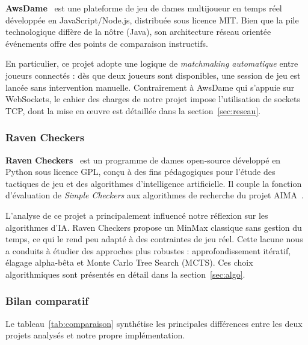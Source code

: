 \documentclass[a4paper]{article}
\begin{document}
\textbf{AwsDame}~\cite{awsdame} est une plateforme de jeu de dames multijoueur
en temps réel développée en JavaScript/Node.js, distribuée sous licence MIT.
Bien que la pile technologique diffère de la nôtre (Java), son architecture
réseau orientée événements offre des points de comparaison instructifs.

En particulier, ce projet adopte une logique de \emph{matchmaking automatique}
entre joueurs connectés : dès que deux joueurs sont disponibles, une session de
jeu est lancée sans intervention manuelle. Contrairement à AwsDame qui s'appuie
sur WebSockets, le cahier des charges de notre projet impose l'utilisation de
sockets TCP, dont la mise en œuvre est détaillée dans la
section~\ref{sec:reseau}.

\subsubsection*{Raven Checkers}

\textbf{Raven Checkers}~\cite{ravencheckers} est un programme de dames
open-source développé en Python sous licence GPL, conçu à des fins pédagogiques
pour l'étude des tactiques de jeu et des algorithmes d'intelligence artificielle.
Il couple la fonction d'évaluation de \emph{Simple Checkers} aux algorithmes
de recherche du projet AIMA~\cite{aima}.

L'analyse de ce projet a principalement influencé notre réflexion sur les
algorithmes d'IA. Raven Checkers propose un MinMax classique sans gestion du
temps, ce qui le rend peu adapté à des contraintes de jeu réel. Cette lacune
nous a conduits à étudier des approches plus robustes : approfondissement
itératif, élagage alpha-bêta et Monte Carlo Tree Search (MCTS). Ces choix
algorithmiques sont présentés en détail dans la section~\ref{sec:algo}.

\subsubsection*{Bilan comparatif}

Le tableau~\ref{tab:comparaison} synthétise les principales différences entre
les deux projets analysés et notre propre implémentation.
\end{document}
